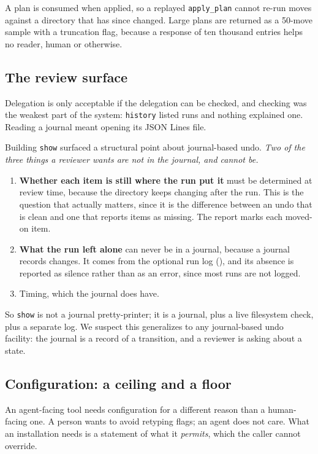 \documentclass[11pt,a4paper]{article}
\newcommand{\code}[1]{\texttt{\small #1}}
\begin{document}
A plan is consumed when applied, so a replayed \code{apply\_plan} cannot re-run
moves against a directory that has since changed. Large plans are returned as a
50-move sample with a truncation flag, because a response of ten thousand
entries helps no reader, human or otherwise.

\subsection{The review surface}
\label{sec:agent:review}

Delegation is only acceptable if the delegation can be checked, and checking
was the weakest part of the system: \code{history} listed runs and nothing
explained one. Reading a journal meant opening its JSON Lines file.

Building \code{show} surfaced a structural point about journal-based undo.
\emph{Two of the three things a reviewer wants are not in the journal, and
cannot be.}

\begin{enumerate}[leftmargin=1.6em,itemsep=0.25em]
  \item \textbf{Whether each item is still where the run put it} must be
    determined at review time, because the directory keeps changing after the
    run. This is the question that actually matters, since it is the difference
    between an undo that is clean and one that reports items as missing. The
    report marks each moved-on item.
  \item \textbf{What the run left alone} can never be in a journal, because a
    journal records changes. It comes from the optional run log
    (), and its absence is reported as silence rather than as an
    error, since most runs are not logged.
  \item Timing, which the journal does have.
\end{enumerate}

So \code{show} is not a journal pretty-printer; it is a journal, plus a live
filesystem check, plus a separate log. We suspect this generalizes to any
journal-based undo facility: the journal is a record of a transition, and a
reviewer is asking about a state.

\subsection{Configuration: a ceiling and a floor}
\label{sec:agent:config}

An agent-facing tool needs configuration for a different reason than a
human-facing one. A person wants to avoid retyping flags; an agent does not
care. What an installation needs is a statement of what it \emph{permits},
which the caller cannot override.
\end{document}
